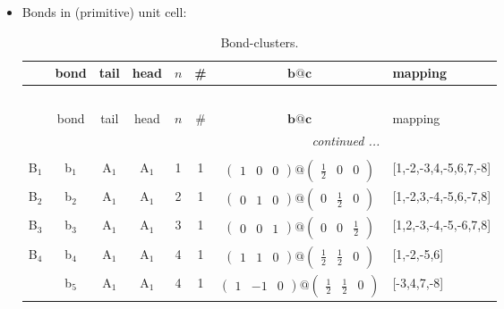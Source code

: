 \documentclass[fleqn,10pt,landscape]{article}
\begin{document}
\begin{itemize}
\item Bonds in (primitive) unit cell:
\begin{center}
\renewcommand{\arraystretch}{1.3}
\begin{longtable}{cc|cc|c|c|c|l}
\caption{Bond-clusters.}
 \\
 \hline \hline
 & bond & tail & head & $n$ & \# & $\bm{b}@\bm{c}$ & mapping \\ \hline \endfirsthead

\multicolumn{7}{l}{\tablename\ \thetable{}} \\
 \hline \hline
 & bond & tail & head & $n$ & \# & $\bm{b}@\bm{c}$ & mapping \\ \hline \endhead

 \hline \hline
\multicolumn{7}{r}{\footnotesize\it continued ...} \\ \endfoot

 \hline \hline
\multicolumn{7}{r}{} \\ \endlastfoot

B$_{1}$ & b$_{1}$ & A$_{1}$ & A$_{1}$ & 1 & 1 & $\begin{pmatrix} 1 & 0 & 0 \end{pmatrix}@\begin{pmatrix} \frac{1}{2} & 0 & 0 \end{pmatrix}$ & [1,-2,-3,4,-5,6,7,-8] \\ \hline
B$_{2}$ & b$_{2}$ & A$_{1}$ & A$_{1}$ & 2 & 1 & $\begin{pmatrix} 0 & 1 & 0 \end{pmatrix}@\begin{pmatrix} 0 & \frac{1}{2} & 0 \end{pmatrix}$ & [1,-2,3,-4,-5,6,-7,8] \\ \hline
B$_{3}$ & b$_{3}$ & A$_{1}$ & A$_{1}$ & 3 & 1 & $\begin{pmatrix} 0 & 0 & 1 \end{pmatrix}@\begin{pmatrix} 0 & 0 & \frac{1}{2} \end{pmatrix}$ & [1,2,-3,-4,-5,-6,7,8] \\ \hline
B$_{4}$ & b$_{4}$ & A$_{1}$ & A$_{1}$ & 4 & 1 & $\begin{pmatrix} 1 & 1 & 0 \end{pmatrix}@\begin{pmatrix} \frac{1}{2} & \frac{1}{2} & 0 \end{pmatrix}$ & [1,-2,-5,6] \\
& b$_{5}$ & A$_{1}$ & A$_{1}$ & 4 & 1 & $\begin{pmatrix} 1 & -1 & 0 \end{pmatrix}@\begin{pmatrix} \frac{1}{2} & \frac{1}{2} & 0 \end{pmatrix}$ & [-3,4,7,-8] \\
\end{longtable}
\end{center}


\end{itemize}
\end{document}
